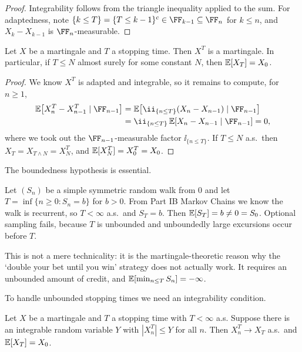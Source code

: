 \documentclass[a4paper]{scrartcl}
\begin{document}
\begin{proof}
	Integrability follows from the triangle inequality applied to the sum. For adaptedness, note $\{k \leq T\} = \{T \leq k-1\}^c \in\FF_{k-1}\subseteq\FF_n$ for $k \leq n$, and $X_k - X_{k-1}$ is $\FF_n$-measurable.
\end{proof}

\begin{theorem}\label{thm:optional-sampling}
	Let $X$ be a martingale and $T$ a stopping time. Then $X^T$ is a martingale. In particular, if $T \leq N$ almost surely for some constant $N$, then $\mathbb{E}[X_T] = X_0$.
\end{theorem}

\begin{proof}
	We know $X^T$ is adapted and integrable, so it remains to compute, for $n\geq1$,
	\begin{align*}
		\EE\big[X_n^T - X_{n-1}^T \mid\FF_{n-1}\big] &= \EE\big[\ii_{\{n\leq T\}}(X_n - X_{n-1})\mid\FF_{n-1}\big]\\
		&= \ii_{\{n\leq T\}}\,\EE[X_n - X_{n-1}\mid\FF_{n-1}] = 0,
	\end{align*}
	where we took out the $\FF_{n-1}$-measurable factor $\ii_{\{n\leq T\}}$. If $T \leq N$ a.s.\ then $X_T = X_{T\wedge N} = X_N^T$, and $\mathbb{E}[X^T_N] = X^T_0 = X_0$.
\end{proof}

The boundedness hypothesis is essential.

\begin{example}\label{ex:doubling}
	Let $(S_n)$ be a simple symmetric random walk from $0$ and let $T = \inf\{n\geq0 : S_n = b\}$ for $b > 0$. From Part IB Markov Chains we know the walk is recurrent, so $T < \infty$ a.s.\ and $S_T = b$. Then $\mathbb{E}[S_T] = b \neq 0 = S_0$. Optional sampling fails, because $T$ is unbounded and unboundedly large excursions occur before $T$.

	This is not a mere technicality: it is the martingale-theoretic reason why the `double your bet until you win' strategy does not actually work. It requires an unbounded amount of credit, and $\mathbb{E}[\min_{n \leq T}S_n] = -\infty$.
\end{example}

To handle unbounded stopping times we need an integrability condition.

\begin{theorem}\label{thm:optional-stopping}
	Let $X$ be a martingale and $T$ a stopping time with $T<\infty$ a.s. Suppose there is an integrable random variable $Y$ with $|X^T_n| \leq Y$ for all $n$. Then $X_n^T \to X_T$ a.s.\ and $\mathbb{E}[X_T] = X_0$.
\end{theorem}
\end{document}
